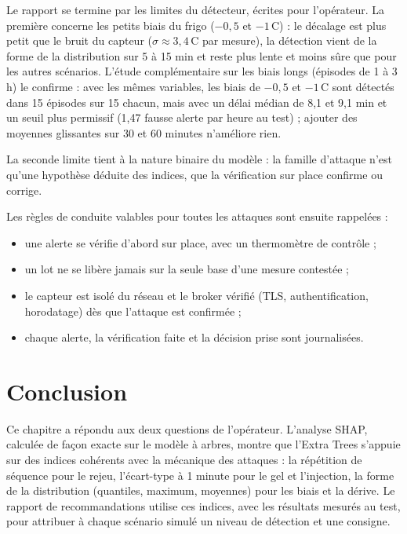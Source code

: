 Le rapport se termine par les limites du détecteur, écrites pour
l'opérateur. La première concerne les petits biais du frigo ($-0{,}5$ et
$-1$\,\textdegree C) : le décalage est plus petit que le bruit du capteur
($\sigma \approx 3{,}4$\,\textdegree C par mesure), la détection vient de la
forme de la distribution sur 5 à 15 min et reste plus lente et moins sûre
que pour les autres scénarios. L'étude complémentaire sur les biais longs
(épisodes de 1 à 3 h) le confirme : avec les mêmes variables, les biais de
$-0{,}5$ et $-1$\,\textdegree C sont détectés dans 15 épisodes sur 15
chacun, mais avec un délai médian de 8,1 et 9,1 min et un seuil plus
permissif (1,47 fausse alerte par heure au test) ; ajouter des moyennes
glissantes sur 30 et 60 minutes n'améliore rien.

La seconde limite tient à la nature binaire du modèle : la famille d'attaque
n'est qu'une hypothèse déduite des indices, que la vérification sur place
confirme ou corrige.

Les règles de conduite valables pour toutes les attaques sont ensuite
rappelées :

\begin{itemize}
  \item une alerte se vérifie d'abord sur place, avec un thermomètre de
        contrôle ;
  \item un lot ne se libère jamais sur la seule base d'une mesure
        contestée ;
  \item le capteur est isolé du réseau et le broker vérifié (TLS,
        authentification, horodatage) dès que l'attaque est confirmée ;
  \item chaque alerte, la vérification faite et la décision prise sont
        journalisées.
\end{itemize}


\section{Conclusion}

Ce chapitre a répondu aux deux questions de l'opérateur. L'analyse SHAP,
calculée de façon exacte sur le modèle à arbres, montre que l'Extra Trees
s'appuie sur des indices cohérents avec la mécanique des attaques : la
répétition de séquence pour le rejeu, l'écart-type à 1 minute pour le gel
et l'injection, la forme de la distribution (quantiles, maximum, moyennes)
pour les biais et la dérive. Le rapport de recommandations utilise ces
indices, avec les résultats mesurés au test, pour attribuer à chaque
scénario simulé un niveau de détection et une consigne.

